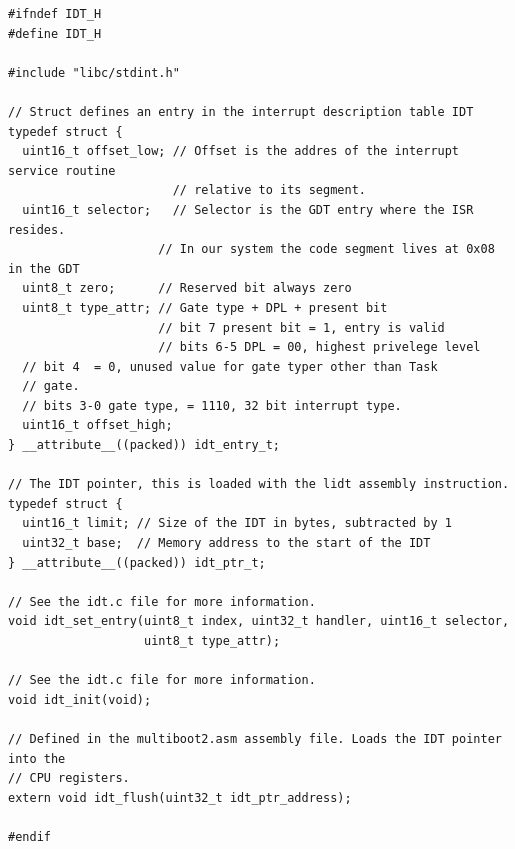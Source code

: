 \documentclass[../main.tex]{subfiles}
\begin{document}
\begin{listing}[H]
    \begin{verbatim}
#ifndef IDT_H
#define IDT_H

#include "libc/stdint.h"

// Struct defines an entry in the interrupt description table IDT
typedef struct {
  uint16_t offset_low; // Offset is the addres of the interrupt service routine
                       // relative to its segment.
  uint16_t selector;   // Selector is the GDT entry where the ISR resides.
                     // In our system the code segment lives at 0x08 in the GDT
  uint8_t zero;      // Reserved bit always zero
  uint8_t type_attr; // Gate type + DPL + present bit
                     // bit 7 present bit = 1, entry is valid
                     // bits 6-5 DPL = 00, highest privelege level
  // bit 4  = 0, unused value for gate typer other than Task
  // gate.
  // bits 3-0 gate type, = 1110, 32 bit interrupt type.
  uint16_t offset_high;
} __attribute__((packed)) idt_entry_t;

// The IDT pointer, this is loaded with the lidt assembly instruction.
typedef struct {
  uint16_t limit; // Size of the IDT in bytes, subtracted by 1
  uint32_t base;  // Memory address to the start of the IDT
} __attribute__((packed)) idt_ptr_t;

// See the idt.c file for more information.
void idt_set_entry(uint8_t index, uint32_t handler, uint16_t selector,
                   uint8_t type_attr);

// See the idt.c file for more information.
void idt_init(void);

// Defined in the multiboot2.asm assembly file. Loads the IDT pointer into the
// CPU registers.
extern void idt_flush(uint32_t idt_ptr_address);

#endif
    \end{verbatim}
    \caption{Implementation of \texttt{idt.h}}
    \label{lst:idt_h}
\end{listing}
\end{document}
